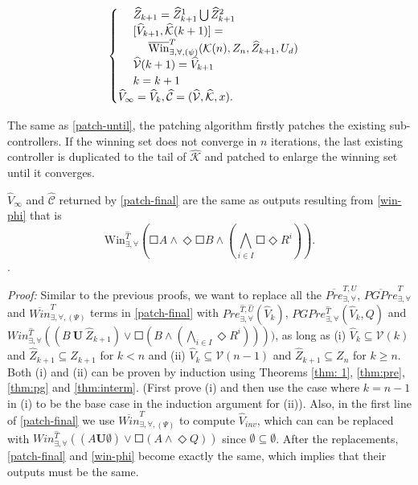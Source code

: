 {\begin{align}
\begin{cases}
\ \ \ \ \widehat{Z}_{k+1} = \widehat{Z}_{k+1}^1\bigcup\widehat{Z}_{k+1}^2  \\
\ \ \ \ [\widehat{V}_{k+1},\widehat{\mathcal{K}}(k+1)]=\\
\ \ \ \ \ \ \ \ \overline{\text{Win}}_{\exists,\forall,(\psi)}^{T}(\mathcal{K}(n),Z_{n},\widehat{Z}_{k+1},U_d)\\
\ \ \ \ \widehat{\mathcal{V}}(k+1)=\widehat{V}_{k+1}\\
\ \ \ \ {\color{black} k = k+1}\\
\widehat{V}_\infty = \widehat{V}_k, \widehat{\mathcal{C}} = (\widehat{\mathcal{V}},\widehat{\mathcal{K}},x). 
\end{cases}\label{patch-final}
\end{align}
}

The same as \eqref{patch-until}, the patching algorithm firstly patches the existing sub-controllers. If the winning set does not converge in $ n $ iterations, the last existing controller is duplicated to the tail of $ \widehat{\mathcal{K}} $ and patched to enlarge the winning set until it converges. 

\begin{theorem}
	$ \widehat{V}_\infty $ and $ \widehat{\mathcal{C}} $ returned by \eqref{patch-final} are the same as outputs resulting from \eqref{win-phi} that is
\begin{displaymath}
	\text{Win}_{\exists, \forall}^{\widehat{T}}\left(\Square A \wedge \Diamond \Square B \wedge \left( \bigwedge_{i\in I} \Square \Diamond R^i\right)\right).
\end{displaymath} \label{thm:phi}.
\end{theorem}
\emph{Proof:} Similar to the previous proofs, we want to replace all the $ \overline{Pre}^{T,U}_{\exists,\forall} $, $ \overline{PGPre}^{T}_{\exists,\forall} $ and $ \overline{Win}_{\exists,\forall, (\Psi)}^{T} $ terms in \eqref{patch-final} with $ Pre^{\widehat{T},\widehat{U}}_{\exists,\forall}(\widehat{V}_k) $, $PGPre^{\widehat{T}}_{\exists,\forall}(\widehat{V}_k, Q) $ and $ Win^{\widehat{T}}_{\exists,\forall}((B\ \mathbf{U}\ \widehat{Z}_{k+1})\vee\Square (B\wedge (\bigwedge_{i\in I}\Diamond R^i)))) $, as long as (i) $ \widehat{V}_{k} \subseteq \mathcal{V}(k) $ and $ \widehat{Z}_{k+1}\subseteq Z_{k+1} $ for $ k < n $ and (ii) $ \widehat{V}_k\subseteq \mathcal{V}(n-1) $ and $ \widehat{Z}_{k+1}\subseteq Z_n $ for $ k\geq n $. Both (i) and (ii) can be proven by induction using Theorems \ref{thm: 1}, \ref{thm:pre}, \ref{thm:pg} and \ref{thm:interm}. (First prove (i) and then use the case where $ k=n-1 $ in (i) to be the base case in the induction argument for (ii)). Also, in the first line of \eqref{patch-final} we use $ \overline{Win}_{\exists,\forall,(\Psi)}^{T} $ to compute $ \widehat{V}_{inv} $, which can can be replaced with $ Win_{\exists,\forall}^{\widehat{T}}((A\mathbf{U}\emptyset)\vee \Square(A\wedge \Diamond Q)) $ since $ \emptyset\subseteq \emptyset $. After the replacements, \eqref{patch-final} and \eqref{win-phi} become exactly the same, which implies that their outputs must be the same. \QEDB

